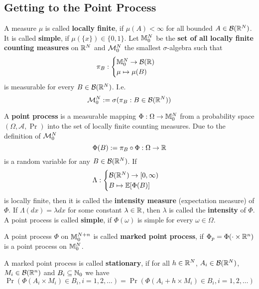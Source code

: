 \subsection{Getting to the Point Process}

A measure \(\mu\) is called \textbf{locally finite}, if \(\mu(A) < \infty\) for
all bounded \(A\in\borel(\real^\dimension)\). It is called \textbf{simple}, if
\(\mu(\{x\})\in\{0,1\}\).
Let \(\locFiniteMeasure\) be the \textbf{set of all locally finite counting measures}
on \(\real^\dimension\) and \(\locFiniteMeasAlg\) the smallest \(\sigma\)-algebra
such that
\[
	\pi_B : \begin{cases}
		\locFiniteMeasure \to \borel(\real)\\
		\mu \mapsto \mu(B)
	\end{cases}
\]
is measurable for every \(B\in\borel(\real^\dimension)\). I.e.
\[
	\locFiniteMeasAlg := \sigma(\pi_B : B\in\borel(\real^\dimension))
\]

\begin{definition}
	A \textbf{point process} is a measurable mapping \(\Phi:\Omega\to\locFiniteMeasure\)
	from a probability space \((\Omega, \mathcal{A}, \Pr)\) into the set of
	locally finite counting measures. Due to the definition of \(\locFiniteMeasAlg\)
	\[
		\Phi(B) := \pi_B\circ \Phi : \Omega \to \real
	\]
	is a random variable for any \(B\in\borel(\real^\dimension)\). If
	\[
		\Lambda:\begin{cases}
			\borel(\real^\dimension)\to [0,\infty)\\
			B \mapsto \E[\Phi(B)]
		\end{cases}
	\]
	is locally finite, then it is called the \textbf{intensity measure}
	(expectation measure) of \(\Phi\).  If \(\Lambda(dx) = \lambda dx\) for some
	constant \(\lambda\in\real\), then \(\lambda\) is called the
	\textbf{intensity} of \(\Phi\).
	A point process is called \textbf{simple}, if \(\Phi(\omega)\) is simple
	for every \(\omega\in\Omega\).
\end{definition}

\begin{definition}
	A point process \(\Phi\) on \(\locFiniteMeasure[\dimension+n]\) is called
	\textbf{marked point process}, if \(\Phi_p = \Phi(\cdot \times \real^n)\)
	is a point process on \(\locFiniteMeasure\).

	A marked point process is called \textbf{stationary}, if for all
	\(h\in\real^\dimension\), \(A_i\in\borel(\real^\dimension)\),
	\(M_i\in\borel(\real^n)\) and \(B_i\subseteq\nat_0\) we have
	\[
		\Pr(\Phi(A_i\times M_i) \in B_i, i=1,2,\dots)
		= \Pr(\Phi(A_i+h \times M_i)\in B_i, i=1,2,\dots)
	\]
\end{definition}

